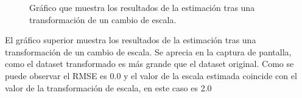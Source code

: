 \begin{figure}[H]
\begin{center}
\hspace{0.5cm}

\end{center}

\caption{Gráfico que muestra los resultados de la estimación tras una transformación de un cambio de escala.}
\end{figure}

El gráfico superior muestra los resultados de la estimación tras una transformación de un cambio de escala. Se aprecia en la captura de pantalla, como el dataset transformado es más grande que el dataset original. Como se puede observar el RMSE es 0.0 y el valor de la escala estimada coincide con el valor de la transformación de escala, en este caso es 2.0

